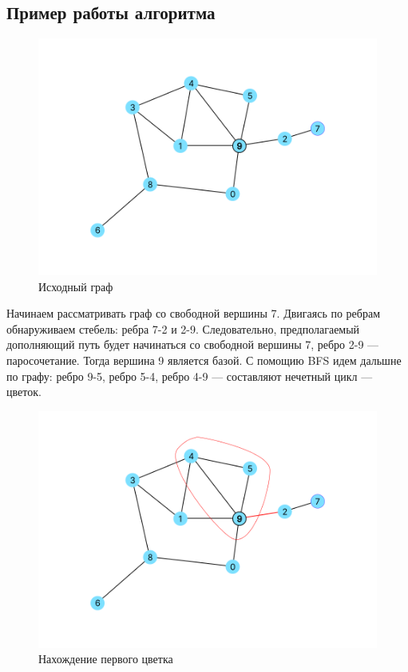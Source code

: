 \documentclass[14pt, a4paper]{extarticle}
\begin{document}
    \subsection*{Пример работы алгоритма}


    \begin{figure}[h!]
        \centering
        \includegraphics[scale=0.3]{1.png}
        \caption{Исходный граф}
        \label{fig:my_label}
    \end{figure}

    Начинаем рассматривать граф со свободной вершины 7. Двигаясь по ребрам обнаруживаем стебель: ребра 7-2 и  2-9. Следовательно, предполагаемый дополняющий путь будет начинаться со свободной вершины 7, ребро 2-9 --- паросочетание. Тогда вершина 9 является базой. С помощию BFS идем дальшне по графу:
    ребро 9-5, ребро 5-4, ребро 4-9 --- составляют нечетный цикл --- цветок.
    
    \begin{figure}[h!]
        \centering
        \includegraphics[scale=0.3]{2.png}
        \caption{Нахождение первого цветка}
        \label{fig:my_label}
    \end{figure}
\end{document}
